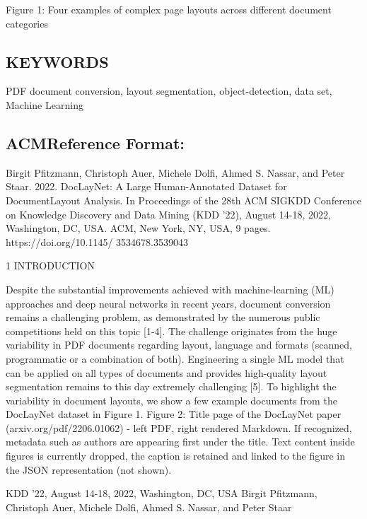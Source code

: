 \begin{figure}[h]
\end{figure}

Figure 1: Four examples of complex page layouts across different document categories

\subsection{KEYWORDS}

PDF document conversion, layout segmentation, object-detection, data set, Machine Learning

\subsection{ACMReference Format:}

Birgit Pfitzmann, Christoph Auer, Michele Dolfi, Ahmed S. Nassar, and Peter Staar. 2022. DocLayNet: A Large Human-Annotated Dataset for DocumentLayout Analysis. In Proceedings of the 28th ACM SIGKDD Conference on Knowledge Discovery and Data Mining (KDD '22), August 14-18, 2022, Washington, DC, USA. ACM, New York, NY, USA, 9 pages. https://doi.org/10.1145/ 3534678.3539043

1 INTRODUCTION

Despite the substantial improvements achieved with machine-learning (ML) approaches and deep neural networks in recent years, document conversion remains a challenging problem, as demonstrated by the numerous public competitions held on this topic [1-4]. The challenge originates from the huge variability in PDF documents regarding layout, language and formats (scanned, programmatic or a combination of both). Engineering a single ML model that can be applied on all types of documents and provides high-quality layout segmentation remains to this day extremely challenging [5]. To highlight the variability in document layouts, we show a few example documents from the DocLayNet dataset in Figure 1. Figure 2: Title page of the DocLayNet paper (arxiv.org/pdf/2206.01062) - left PDF, right rendered Markdown. If recognized, metadata such as authors are appearing first under the title. Text content inside figures is currently dropped, the caption is retained and linked to the figure in the JSON representation (not shown).

KDD '22, August 14-18, 2022, Washington, DC, USA Birgit Pfitzmann, Christoph Auer, Michele Dolfi, Ahmed S. Nassar, and Peter Staar


